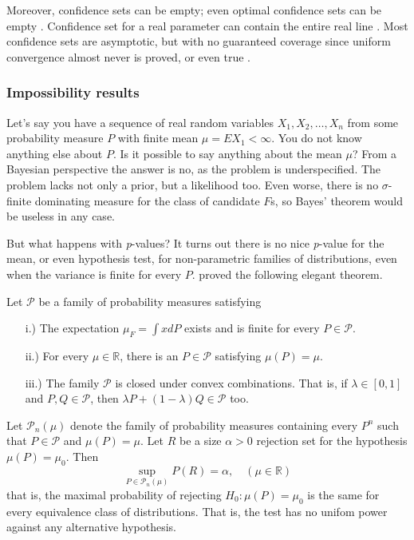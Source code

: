 Moreover, confidence sets can be empty; even optimal confidence sets
can be empty \parencite{Blaker2000-ud}. Confidence set for a real parameter
can contain the entire real line \parencite{Morey2016-ry}. Most confidence
sets are asymptotic, but with no guaranteed coverage since uniform
convergence almost never is proved, or even true \parencite{Gleser1996-kk}.

\subsubsection{Impossibility results}

Let's say you have a sequence of real random variables $X_{1},X_{2},\ldots,X_{n}$
from some probability measure $P$ with finite mean $\mu=EX_{1}<\infty$.
You do not know anything else about $P$. Is it possible to say anything
about the mean $\mu$? From a Bayesian perspective the answer is no,
as the problem is underspecified. The problem lacks not only a prior,
but a likelihood too. Even worse, there is no $\sigma$-finite dominating
measure for the class of candidate $F$s, so Bayes' theorem would
be useless in any case. 

But what happens with \emph{p}-values? It turns out there is no nice
\emph{p}-value for the mean, or even hypothesis test, for non-parametric
families of distributions, even when the variance is finite for every
$P$. \textcite{Bahadur1956-tg} proved the following elegant theorem.
\begin{theorem}
Let $\mathcal{\mathcal{P}}$ be a family of probability measures
satisfying
\begin{enumerate}
\item[i.)] The expectation $\mu_{F}=\int xdP$ exists and is finite for every
$P\in\mathcal{P}$.
\item[ii.)] For every $\mu\in\mathbb{R}$, there is an $P\in\mathcal{\mathcal{P}}$
satisfying $\mu(P)=\mu$.
\item[iii.)] The family $\mathcal{\mathcal{P}}$ is closed under convex combinations.
That is, if $\lambda\in[0,1]$ and $P,Q\in\mathcal{P}$, then $\lambda P+(1-\lambda)Q\in\mathcal{P}$
too.
\end{enumerate}
Let $\mathcal{P}_{n}(\mu)$ denote the family of probability measures
containing every $P^{n}$ such that $P\in\mathcal{P}$ and $\mu(P)=\mu$.
Let $R$ be a size $\alpha>0$ rejection set for the hypothesis $\mu(P)=\mu_{0}$.
Then 
\[
\sup_{P\in\mathcal{P}_{n}(\mu)}P(R)=\alpha,\quad(\mu\in\mathbb{R})
\]
that is, the maximal probability of rejecting $H_{0}:\mu(P)=\mu_{0}$
is the same for every equivalence class of distributions. That is,
the test has no unifom power against any alternative hypothesis. 
\end{theorem}


